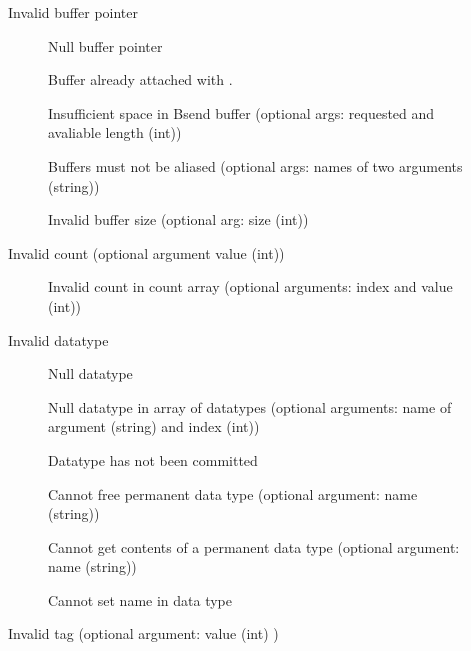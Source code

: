 \begin{description}
\item[]Invalid buffer pointer
    \begin{description}
    \item[]Null buffer pointer
    \item[]Buffer already attached with
      . 
    \item[]Insufficient space in Bsend
      buffer (optional args: requested and avaliable length (int))
    \item[]Buffers must not be aliased
      (optional args: names of two arguments (string))
    \item[]Invalid buffer size (optional arg:
      size (int))
    \end{description}
\item[]Invalid count (optional argument value (int))
    \begin{description}
    \item[]Invalid count in count array
      (optional arguments: index and value (int))
    \end{description}
\item[]Invalid datatype
    \begin{description}
    \item[]Null datatype
    \item[]Null datatype in array of
      datatypes (optional arguments: name of argument (string) and index (int))
    \item[]Datatype has not been
      committed 
    \item[]Cannot free permanent data type
      (optional argument: name (string))
    \item[\mpidconst{MPIi_ERR_TYPE_PERM_CONTENTS]}]Cannot get contents of a
      permanent data type (optional argument: name (string))
    \item[]Cannot set name in data type
    \end{description}
\item[]Invalid tag (optional argument: value (int) )

\end{description}
